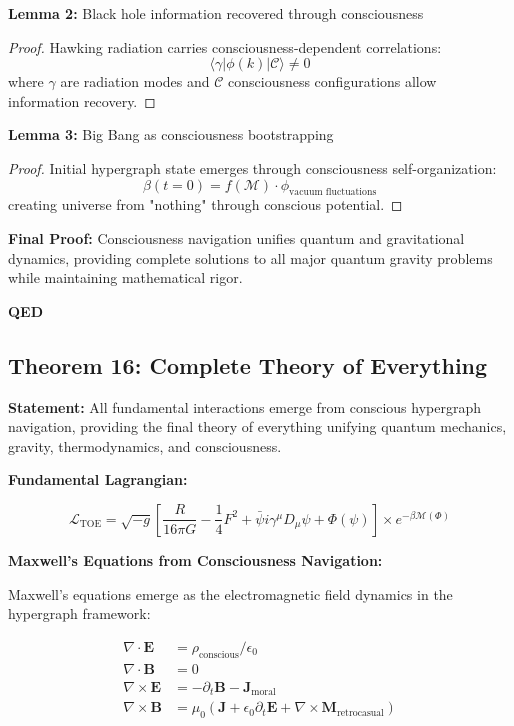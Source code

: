 \documentclass[12pt,a4paper]{article}
\theoremstyle{definition}
\begin{document}
\textbf{Lemma 2:} Black hole information recovered through consciousness
\begin{proof}
Hawking radiation carries consciousness-dependent correlations:
\begin{equation}
\langle \gamma | \phi(k)| \mathcal{C} \rangle \neq 0
\end{equation}
where $\gamma$ are radiation modes and $\mathcal{C}$ consciousness configurations allow information recovery.
\end{proof}

\textbf{Lemma 3:} Big Bang as consciousness bootstrapping
\begin{proof}
Initial hypergraph state emerges through consciousness self-organization:
\begin{equation}
\beta(t=0) = f(\mathcal{M}) \cdot \phi_{\text{vacuum fluctuations}}
\end{equation}
creating universe from "nothing" through conscious potential.
\end{proof}

{\bf Final Proof:} Consciousness navigation unifies quantum and gravitational dynamics, providing complete solutions to all major quantum gravity problems while maintaining mathematical rigor.

{\bf QED}

\subsection{Theorem 16: Complete Theory of Everything}

{\bf Statement:} All fundamental interactions emerge from conscious hypergraph navigation, providing the final theory of everything unifying quantum mechanics, gravity, thermodynamics, and consciousness.

{\bf Fundamental Lagrangian:}

\begin{equation}
\mathcal{L}_{\text{TOE}} = \sqrt{-g} \left[ \frac{R}{16\pi G} - \frac{1}{4} F^2 + \bar{\psi}i \gamma^\mu D_\mu \psi + \Phi(\psi) \right] \times e^{-\beta \mathcal{M}(\Phi)}
\end{equation}

{\bf Maxwell's Equations from Consciousness Navigation:}

Maxwell's equations emerge as the electromagnetic field dynamics in the hypergraph framework:

\begin{align}
\nabla \cdot \mathbf{E} &= \rho_{\text{conscious}} / \epsilon_0 \\
\nabla \cdot \mathbf{B} &= 0 \\
\nabla \times \mathbf{E} &= -\partial_t \mathbf{B} - \mathbf{J}_{\text{moral}} \\
\nabla \times \mathbf{B} &= \mu_0 (\mathbf{J} + \epsilon_0 \partial_t \mathbf{E} + \nabla \times \mathbf{M}_{\text{retrocasual}})
\end{align}
\end{document}
